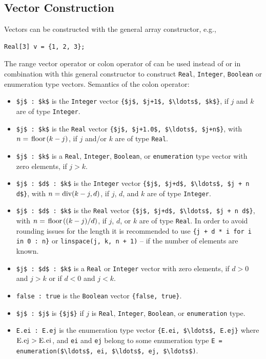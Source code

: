 \subsection{Vector Construction}\label{vector-construction}

Vectors can be constructed with the general array constructor, e.g.,
\begin{lstlisting}[language=modelica]
Real[3] v = {1, 2, 3};
\end{lstlisting}
The range vector operator or colon operator of  can be used instead of or in combination with this general constructor to construct \lstinline!Real!, \lstinline!Integer!, \lstinline!Boolean! or enumeration type vectors.
Semantics of the colon operator:
\begin{itemize}
\item
  \lstinline!$j$ : $k$! is the \lstinline!Integer! vector \lstinline!{$j$, $j+1$, $\ldots$, $k$}!, if $j$ and $k$ are of type
  \lstinline!Integer!.
\item
  \lstinline!$j$ : $k$! is the \lstinline!Real! vector \lstinline!{$j$, $j+1.0$, $\ldots$, $j+n$}!, with $n = \text{\lstinline!floor!}(k - j)$, if
  $j$ and/or $k$ are of type \lstinline!Real!.
\item
  \lstinline!$j$ : $k$! is a \lstinline!Real!, \lstinline!Integer!, \lstinline!Boolean!, or \lstinline!enumeration! type vector with zero elements, if $j > k$.
\item
  \lstinline!$j$ : $d$ : $k$! is the \lstinline!Integer! vector \lstinline!{$j$, $j+d$, $\ldots$, $j + n d$}!, with $n = \text{\lstinline!div!}(k - j, d)$, if $j$, $d$, and $k$ are of type \lstinline!Integer!.
\item
  \lstinline!$j$ : $d$ : $k$! is the \lstinline!Real! vector \lstinline!{$j$, $j+d$, $\ldots$, $j + n d$}!, with $n = \text{\lstinline!floor!}((k-j)/d)$, if $j$, $d$, or $k$ are of type \lstinline!Real!.
  In order to avoid rounding issues for the length it is recommended to use \lstinline!{j + d * i for i in 0 : n}! or \lstinline!linspace(j, k, n + 1)! -- if the number of elements are known.
\item
  \lstinline!$j$ : $d$ : $k$! is a \lstinline!Real! or \lstinline!Integer! vector with zero elements, if $d > 0$ and $j > k$ or if $d < 0$ and $j < k$.
\item
  \lstinline!false : true! is the \lstinline!Boolean! vector \lstinline!{false, true}!.
\item
  \lstinline!$j$ : $j$! is \lstinline!{$j$}! if $j$ is \lstinline!Real!, \lstinline!Integer!, \lstinline!Boolean!, or \lstinline!enumeration! type.
\item
  \lstinline!E.ei : E.ej! is the enumeration type vector \lstinline!{E.ei, $\ldots$, E.ej}! where
  $\text{\lstinline!E.ej!} > \text{\lstinline!E.ei!}$, and \lstinline!ei! and \lstinline!ej! belong to some enumeration type
  \lstinline!E = enumeration($\ldots$, ei, $\ldots$, ej, $\ldots$)!.
\end{itemize}

